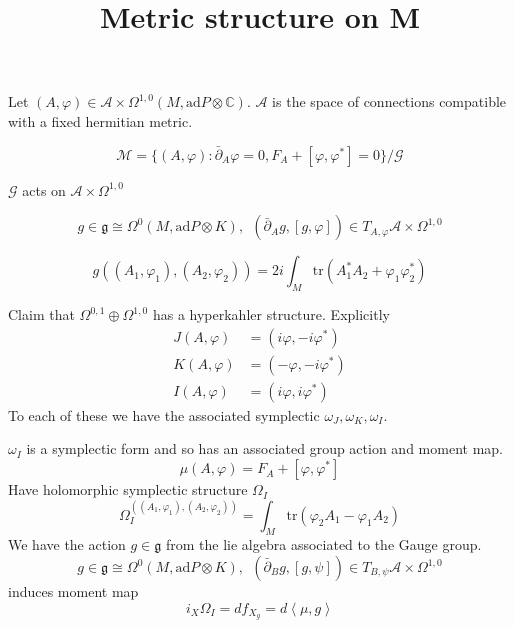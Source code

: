 % 



\title{Metric structure on M}
\author{}
\date{}

 
\maketitle

Let $ ( A , \varphi) \in \mathcal{A} \times \Omega ^{1,0} ( M, \mathrm{ad} P \otimes \mathbb{C} ) $.
$\mathcal{A} $ is the space of connections compatible with a fixed hermitian metric. 

\begin{equation}
    \mathcal{M} = \{ ( A, \varphi) : \bar{\partial} _A \varphi = 0 , F_A + [\varphi, \varphi^*] = 0 \} / \mathcal{G}
\end{equation}

$\mathcal{G} $ acts on $ \mathcal{A} \times \Omega^{1,0} $ 


\begin{equation}
    g \in \mathfrak{g} \cong \Omega^0 (M, \mathrm{ad}P \otimes K ) ,~~ ( \bar{\partial}_A g, [g, \varphi]) \in T_{A, \varphi} \mathcal{A} \times \Omega^{1,0} 
\end{equation}

\begin{equation}
    g((A_1, \varphi_1) , (A_2, \varphi_2)) = 2i \int _M \mathrm{tr} ( A_1 ^* A_2 + \varphi_1 \varphi_2 ^* ) 
\end{equation}


Claim that $ \Omega^{0,1} \oplus \Omega^{1,0} $ has a hyperkahler structure. 
Explicitly 
\begin{align}
    J(A, \varphi) & = (i \varphi, -i \varphi^*) \\ 
    K(A, \varphi) & = (- \varphi, -i \varphi^*) \\ 
    I(A, \varphi) & = (i \varphi, i \varphi^*) 
\end{align}
To each of these we have the associated symplectic $\omega_J, \omega_K, \omega_I$.

$\omega_I$ is a symplectic form and so has an associated group action and moment map.
\begin{equation}
    \mu(A, \varphi) = F_A + [\varphi, \varphi^*] 
\end{equation}
Have holomorphic symplectic structure $\Omega_I$ 
\begin{equation}
    \Omega_I ^{((A_1, \varphi_1), (A_2, \varphi_2))} = \int_M \mathrm{tr}(\varphi_2 A_1 - \varphi_1 A_2) 
\end{equation}
We have the action $g \in \mathfrak{g} $ from the lie algebra associated to the Gauge group. 
\begin{equation}
    g \in \mathfrak{g} \cong \Omega^0 (M, \mathrm{ad}P \otimes K ) ,~~ ( \bar{\partial}_B g, [g, \psi]) \in T_{B, \psi} \mathcal{A} \times \Omega^{1,0} 
\end{equation}
induces moment map
\begin{equation}
    i_X \Omega_I = d f_{X_g} = d \left< \mu, g \right> 
\end{equation}

